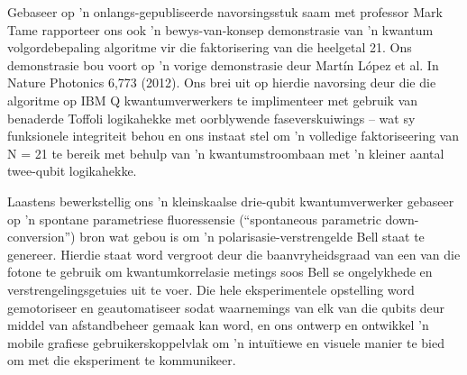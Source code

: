 \bigskip
\noindent
Gebaseer op 'n onlangs-gepubliseerde navorsingsstuk saam met professor Mark Tame rapporteer ons ook 'n bewys-van-konsep demonstrasie van 'n kwantum volgordebepaling algoritme vir die faktorisering van die heelgetal 21. Ons demonstrasie bou voort op 'n vorige demonstrasie deur Martín López et al. In Nature Photonics 6,773 (2012). Ons brei uit op hierdie navorsing deur die die algoritme op IBM Q kwantumverwerkers te implimenteer met gebruik van benaderde Toffoli logikahekke met oorblywende faseverskuiwings – wat sy funksionele integriteit behou en ons instaat stel om 'n volledige faktoriseering van N = 21 te bereik met behulp van 'n kwantumstroombaan met 'n kleiner aantal twee-qubit logikahekke.


\bigskip
\noindent
Laastens bewerkstellig ons 'n kleinskaalse drie-qubit kwantumverwerker gebaseer op 'n spontane parametriese fluoressensie (“spontaneous parametric down-conversion”) bron wat gebou is om 'n polarisasie-verstrengelde Bell staat te genereer. Hierdie staat word vergroot deur die baanvryheidsgraad van een van die fotone te gebruik om kwantumkorrelasie metings soos Bell se ongelykhede en verstrengelingsgetuies uit te voer. Die hele eksperimentele opstelling word gemotoriseer en geautomatiseer sodat waarnemings van elk van die qubits deur middel van afstandbeheer gemaak kan word, en ons ontwerp en ontwikkel 'n mobile grafiese gebruikerskoppelvlak om 'n intuïtiewe en visuele manier te bied om met die eksperiment te kommunikeer.

\clearpage

